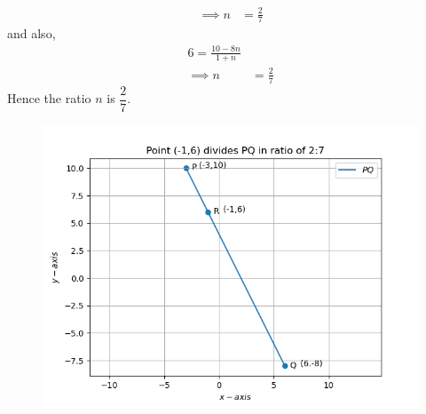 \documentclass[12pt]{article}
\begin{document}
\begin{enumerate}
\begin{align}
         \implies n &=\frac{2}{7}
\end{align}
and also,
\begin{align}
         6 =\frac{10-8n}{1+n}\\
          \implies n &=\frac{2}{7}
\end{align}
Hence the ratio $n$ is $\dfrac{2}{7}$.
\begin{figure}[!h]
 \begin{center}
  \includegraphics[width=\columnwidth]{figs/Figure_1.png}
 \end{center}
\caption{}
\label{fig:Fig1}
\end{figure}
\end{enumerate}
\end{document}
